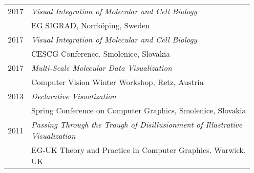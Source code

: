 \documentclass[a4paper,11pt]{letter}
\begin{document}
\begin{tabular}{l| l}
2017 & \emph{Visual Integration of Molecular and Cell Biology} \\
 & EG SIGRAD, Norrk\"oping, Sweden \\
2017 & \emph{Visual Integration of Molecular and Cell Biology} \\
 & CESCG Conference, Smolenice, Slovakia \\
2017 & \emph{Multi-Scale Molecular Data Visualization} \\
 & Computer Vision Winter Workshop, Retz, Austria \\ 
2013 & \emph{Declarative Visualization} \\
 & Spring Conference on Computer Graphics, Smolenice, Slovakia \\
2011 & \emph{Passing Through the Trough of Disillusionment of Illustrative Visualization} \\
 & EG-UK Theory and Practice in Computer Graphics, Warwick, UK \\
\hline
\end{tabular}
\end{document}
